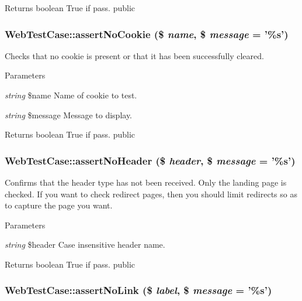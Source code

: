 \begin{DoxyReturn}{Returns}
boolean True if pass.  public 
\end{DoxyReturn}
\hypertarget{class_web_test_case_a5531615ad22f67d48ce596041c43f545}{
\subsubsection[{assertNoCookie}]{\setlength{\rightskip}{0pt plus 5cm}WebTestCase::assertNoCookie (\$ {\em name}, \/  \$ {\em message} = {\ttfamily '\%s'})}}
\label{class_web_test_case_a5531615ad22f67d48ce596041c43f545}
Checks that no cookie is present or that it has been successfully cleared. 
\begin{DoxyParams}{Parameters}
\item[{\em string}]\$name Name of cookie to test. \item[{\em string}]\$message Message to display. \end{DoxyParams}
\begin{DoxyReturn}{Returns}
boolean True if pass.  public 
\end{DoxyReturn}
\hypertarget{class_web_test_case_aaad06de3e0ed7fb74081ff9a6633a3fb}{
\subsubsection[{assertNoHeader}]{\setlength{\rightskip}{0pt plus 5cm}WebTestCase::assertNoHeader (\$ {\em header}, \/  \$ {\em message} = {\ttfamily '\%s'})}}
\label{class_web_test_case_aaad06de3e0ed7fb74081ff9a6633a3fb}
Confirms that the header type has not been received. Only the landing page is checked. If you want to check redirect pages, then you should limit redirects so as to capture the page you want. 
\begin{DoxyParams}{Parameters}
\item[{\em string}]\$header Case insensitive header name. \end{DoxyParams}
\begin{DoxyReturn}{Returns}
boolean True if pass.  public 
\end{DoxyReturn}
\hypertarget{class_web_test_case_a317931c404b513787a96c801f852d01f}{
\subsubsection[{assertNoLink}]{\setlength{\rightskip}{0pt plus 5cm}WebTestCase::assertNoLink (\$ {\em label}, \/  \$ {\em message} = {\ttfamily '\%s'})}}
